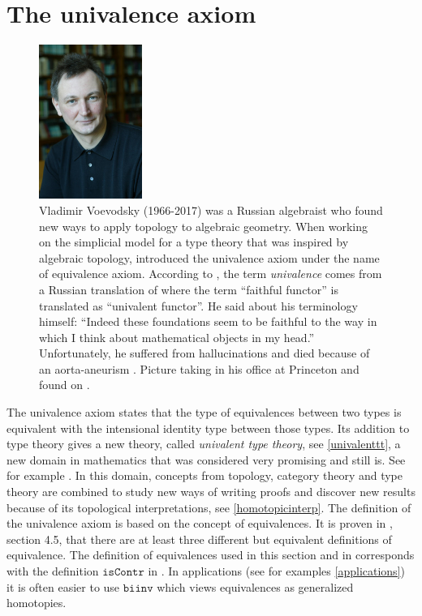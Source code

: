 \documentclass[12pt,a4paper,twoside,xetex]{book} %
\newcommand{\keyword}[1]{\emph{#1}\index{#1}}
\newcommand{\op}[1]{\mathtt{#1}}
\begin{document}
\section{The univalence axiom}

\begin{figure}
\begin{center}
\includegraphics[width=0.3\textwidth]{figures/Voevodsky}
\par\end{center}
\caption{\label{fig:Vladimir-Voevodsky-1966-2017}
  Vladimir Voevodsky (1966-2017)  was a Russian
algebraist who found new ways to apply topology to algebraic geometry. When 
working on the simplicial model for a type theory that was inspired by 
algebraic topology, \cite{Voevodsky2010a} introduced the univalence axiom under 
the name of equivalence axiom. According to \cite{Voevodsky2014}, the term \keyword{univalence} comes from a 
Russian translation of \cite{Boardman2006} where  the term
\textquotedblleft faithful functor\textquotedblright{} is translated
as \textquotedblleft univalent functor\textquotedblright . He said about his terminology himself: ``Indeed these foundations seem 
to be faithful to the way in which I think about mathematical objects in my 
head.''
 Unfortunately, he suffered from hallucinations \cite{Baez2017} and died 
because of an aorta-aneurism \cite{Rehmeyer2017}. Picture taking in his office at Princeton and found on \cite{Grayson2017}.}
\end{figure}

The univalence axiom states that the type of equivalences between two types is 
equivalent with the intensional identity type between those types. Its addition 
to type theory gives a new theory, called \keyword{univalent type theory}, see 
\cref{univalenttt}, a new domain in mathematics that was considered very 
promising and still is. See for example \cite{shulman_2018}. In this domain, concepts from topology, category theory 
and type theory  are combined to study new ways of writing proofs and discover 
new results because of its topological interpretations, see 
\cref{homotopicinterp}. The definition of the univalence axiom is based on the 
concept of equivalences. It is proven in \cite{Voevodsky2013}, section 4.5, 
that there are at least three different but equivalent definitions of 
equivalence. The definition of equivalences used in this section and in 
\cite{Pelayo2014} corresponds with the definition $\op{isContr}$ in 
\cite{Voevodsky2013}. In applications (see for examples \cref{applications}) it 
is often easier to use $\op{biinv}$ which views equivalences as
generalized homotopies.
\end{document}
